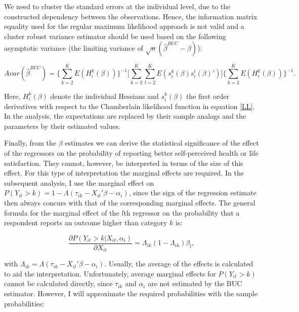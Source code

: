 \documentclass[12pt]{article}
\begin{document}
We need to cluster the standard errors at the individual level, due to the constructed dependency between the observations. Hence, the information matrix equality used for the regular maximum likelihood approach is not valid and a cluster robust variance estimator should be used based on the following asymptotic variance (the limiting variance of $\sqrt{n}(\hat{\beta}^{BUC}-\beta)$):

\begin{equation}
    Avar(\hat{\beta}^{BUC}) = \Bigg\{ \sum_{k=2}^{K}{E(H_{i}^{k}(\beta))} \Bigg\}^{-1} \Bigg[ \sum_{k=2}^{K}\sum_{l=2}^{K}{E(s_{i}^k(\beta)s_{i}^l(\beta)')} \Bigg] \Bigg\{ \sum_{k=2}^{K}{E(H_{i}^{k}(\beta))} \Bigg\}^{-1}.
\end{equation}

\noindent Here, $H_{i}^k(\beta)$ denote the individual Hessians and $s_{i}^k(\beta)$ the first order derivatives with respect to the Chamberlain likelihood function in equation \ref{LL}. In the analysis, the expectations are replaced by their sample analogs and the parameters by their estimated values.

Finally, from the $\beta$ estimates we can derive the statistical significance of the effect of the regressors on the probability of reporting better self-perceived health or life satisfaction. They cannot, however, be interpreted in terms of the size of this effect. For this type of interpretation the marginal effects are required. In the subsequent analysis, I use the marginal effect on $P(Y_{it}>k) = 1 - \Lambda(\tau_{ik}-X_{it}'\beta-\alpha_{i})$, since the sign of the regression estimate then always concurs with that of the corresponding marginal effects. The general formula for the marginal effect of the $l$th regressor on the probability that a respondent reports an outcome higher than category $k$ is: 

\begin{equation}
    \frac{\partial P(Y_{it}>k|X_{it},\alpha_{i})}{\partial X_{it}} = \Lambda_{ik}(1-\Lambda_{ik})\beta_{l},
\end{equation}

with $\Lambda_{ik} = \Lambda(\tau_{ik} - X_{it}'\beta - \alpha_{i})$. Usually, the average of the effects is calculated to aid the interpretation. Unfortunately, average marginal effects for $P(Y_{it}>k)$ cannot be calculated directly, since $\tau_{ik}$ and $\alpha_{i}$ are not estimated by the BUC estimator. However, I will approximate the required probabilities with the sample probabilities:
\end{document}
